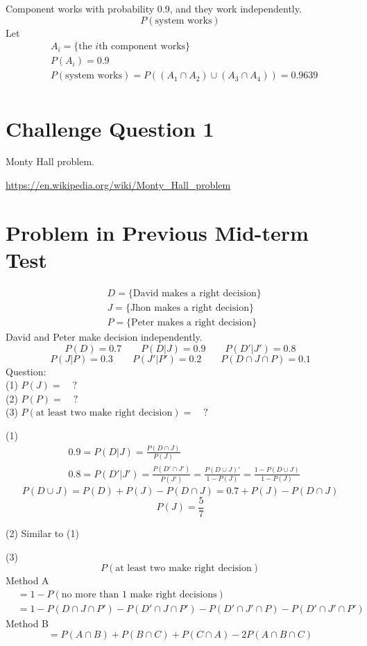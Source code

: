 \begin{exmp}
Component works with probability 0.9, and they work independently.
\[P(\text{system works})\]
Let
\begin{align*}
&A_i=\{ \text{the }i\text{th component works} \}	\\
&P(A_i)=0.9	\\
&P(\text{system works})=P\left( (A_1 \cap A_2)\cup(A_3 \cap A_4) \right)=0.9639\\
\end{align*}
\end{exmp}

\section{Challenge Question 1}
Monty Hall problem.

\url{https://en.wikipedia.org/wiki/Monty_Hall_problem}


\section{Problem in Previous Mid-term Test}
 \begin{exmp}
 \begin{align*}
   &D=\{\text{David makes a right decision}\}	\\
   &J=\{\text{Jhon makes a right decision}\}	\\
   &P=\{\text{Peter makes a right decision}\}	
 \end{align*}
David and Peter make decision independently.
  \[  P(D) = 0.7 \qquad P(D|J)=0.9 \qquad P(D'|J')=0.8  \]
  \[  P(J|P)=0.3 \qquad P(J'|P')=0.2 \qquad P(D \cap J\cap P)=0.1 \]
  Question: \\
  (1) $P(J)= \quad ?$ \\
  (2) $P(P)= \quad ?$ \\
  (3) $P(\text{at least two make right decision})=\quad ?$
\end{exmp}

\begin{solution}
  (1)
  \begin{align*}
  &0.9=P(D|J)=\frac{P(D \cap J)}{P(J)}  \\
  &0.8=P(D'|J')=\frac{P(D'\cap J')}{P(J')}=\frac{P(D\cup J)'}{1-P(J)}=\frac{1-P(D\cup J)}{1-P(J)}
  \end{align*}
  \[P(D\cup J)=P(D)+P(J)-P(D \cap J)=0.7+P(J)-P(D \cap J)\]
  \[P(J)=\frac{5}{7}\]

  (2) Similar to (1)

  (3)
  \[P(\text{at least two make right decision})\]
Method A
\begin{align*}
  &=1-P(\text{no more than 1 make right decisions})\\
  &=1-P(D \cap J \cap P')-P(D' \cap J \cap P')-P(D' \cap J' \cap P)-P(D' \cap J' \cap P')
\end{align*}
Method B
\[ =P(A \cap B)+P(B \cap C) + P(C \cap A)-2 P(A\cap B \cap C)\]
\end{solution}